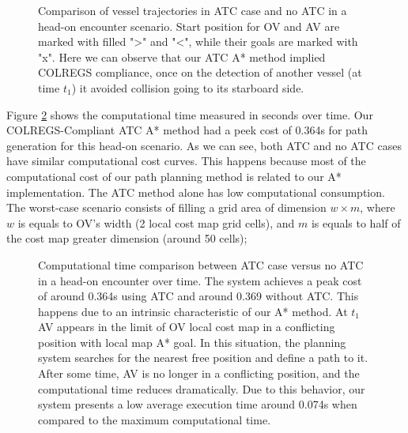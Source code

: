         \begin{figure}[H]
            \centering
            
            \caption{Comparison of vessel trajectories in \ac{ATC} case and no \ac{ATC} in a head-on encounter scenario. Start position for \ac{OV} and \ac{AV} are marked with filled ">" and "<", while their goals are marked with "x". Here we can observe that our \ac{ATC} A* method implied \ac{COLREGS} compliance, once on the detection of another vessel (at time $t_1$) it avoided collision going to its starboard side.}
            \label{fig:plot_ho_w_vs_wo}
        \end{figure}
        
        Figure \ref{fig:plot_ho_w_vs_wo_CT} shows the computational time measured in seconds over time. Our COLREGS-Compliant \ac{ATC} A* method had a peek cost of 0.364s for path generation for this head-on scenario. As we can see, both \ac{ATC} and no \ac{ATC} cases have similar computational cost curves. This happens because most of the computational cost of our path planning method is related to our A* implementation. The \ac{ATC} method alone has low computational consumption. The worst-case scenario consists of filling a grid area of dimension $w \times m$, where $w$ is equals to \ac{OV}'s width (2 local cost map grid cells), and $m$ is equals to half of the cost map greater dimension (around 50 cells);
        \begin{figure}[H]
            \centering
            
            \caption{Computational time comparison between \ac{ATC} case versus no \ac{ATC} in a head-on encounter over time. The system achieves a peak cost of around 0.364s using \ac{ATC} and around 0.369 without \ac{ATC}. This happens due to an intrinsic characteristic of our A* method. At $t_1$ \ac{AV} appears in the limit of \ac{OV} local cost map in a conflicting position with local map A* goal. In this situation, the planning system searches for the nearest free position and define a path to it. After some time, \ac{AV} is no longer in a conflicting position, and the computational time reduces dramatically. Due to this behavior, our system presents a low average execution time around 0.074s when compared to the maximum computational time.}
            \label{fig:plot_ho_w_vs_wo_CT}
        \end{figure}
        
